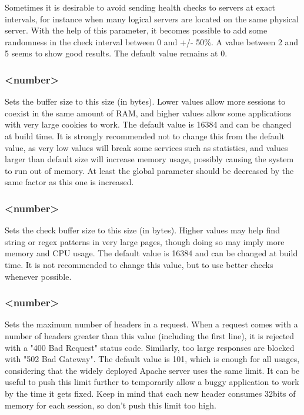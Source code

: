 Sometimes it is desirable to avoid sending health checks to servers at exact
intervals, for instance when many logical servers are located on the same
physical server. With the help of this parameter, it becomes possible to add
some randomness in the check interval between 0 and +/- 50\%. A value between
2 and 5 seems to show good results. The default value remains at 0.

\subsubsection[tune.bufsize]{ <number>}

Sets the buffer size to this size (in bytes). Lower values allow more
sessions to coexist in the same amount of RAM, and higher values allow some
applications with very large cookies to work. The default value is 16384 and
can be changed at build time. It is strongly recommended not to change this
from the default value, as very low values will break some services such as
statistics, and values larger than default size will increase memory usage,
possibly causing the system to run out of memory. At least the global 
parameter should be decreased by the same factor as this one is increased.

\subsubsection[tune.chksize]{ <number>}

Sets the check buffer size to this size (in bytes). Higher values may help
find string or regex patterns in very large pages, though doing so may imply
more memory and CPU usage. The default value is 16384 and can be changed at
build time. It is not recommended to change this value, but to use better
checks whenever possible.

\subsubsection[tune.http.maxhdr]{ <number>}

Sets the maximum number of headers in a request. When a request comes with a
number of headers greater than this value (including the first line), it is
rejected with a "400 Bad Request" status code. Similarly, too large responses
are blocked with "502 Bad Gateway". The default value is 101, which is enough
for all usages, considering that the widely deployed Apache server uses the
same limit. It can be useful to push this limit further to temporarily allow
a buggy application to work by the time it gets fixed. Keep in mind that each
new header consumes 32bits of memory for each session, so don't push this
limit too high.

